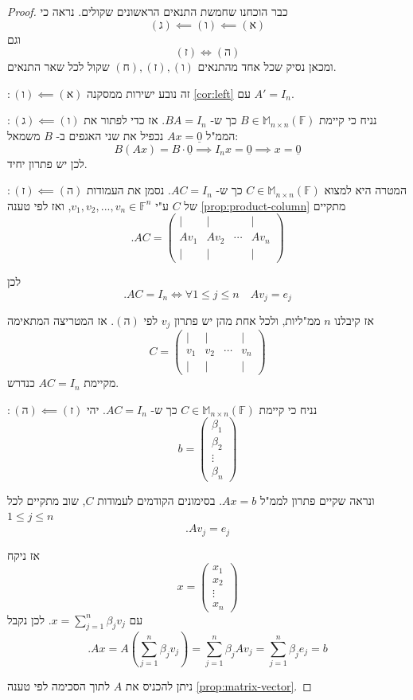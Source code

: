 \documentclass[12pt]{report}
\theoremstyle{plain}
\theoremstyle{definition}
\newcommand{\F}{\mathbb{F}}
\newcommand{\M}{\mathbb{M}}
\newcommand{\0}{\mathbf{0}}
\begin{document}
\begin{proof}
כבר הוכחנו שחמשת התנאים הראשונים שקולים. נראה כי
$$
(\text{ג}) \impliedby (\text{ו}) \impliedby (\text{א})
$$
וגם
$$
(\text{ז}) \iff (\text{ה})
$$
ומכאן נסיק שכל אחד מהתנאים
$
(\text{ח}) ,(\text{ז}) ,(\text{ו})
$
שקול לכל שאר התנאים.

\noindent $
:(\text{ו}) \impliedby (\text{א})
$
זה נובע ישירות ממסקנה
\ref{cor:left}
עם
$A'=I_n$.

\noindent $
:(\text{ג}) \impliedby (\text{ו})
$
נניח כי קיימת
$B\in\M_{n\times n}(\F)$
כך ש-
$BA=I_n$.
אז כדי לפתור את הממ"ל
$Ax=\underline{0}$
נכפיל את שני האגפים ב-
$B$
משמאל:
$$
B(Ax)=B\cdot\underline{0} \implies I_n x=\underline{0} \implies x=\underline{0}
$$
לכן יש פתרון יחיד.

\noindent $
:(\text{ז}) \impliedby (\text{ה})
$
המטרה היא למצוא
$C\in\M_{n\times n}(\F)$
כך ש-
$AC=I_n$.
נסמן את העמודות של 
$C$
ע"י
$v_1,v_2,...,v_n\in\F^n$,
ואז לפי טענה
\ref{prop:product-column}
מתקיים
$$
.AC=\begin{pmatrix}
| & | & & | \\
Av_1 & Av_2 & \cdots & Av_n \\
| & | & & |
\end{pmatrix}
$$

לכן
$$
.AC=I_n \iff \forall 1\leq j\leq n \quad Av_j=e_j
$$

אז קיבלנו
$n$
ממ"ליות,
ולכל אחת מהן יש פתרון
$v_j$
לפי 
$(\text{ה})$.
אז המטריצה המתאימה 
$$
C=\begin{pmatrix}
| & | & & | \\
v_1 & v_2 & \cdots & v_n \\
| & | & & |
\end{pmatrix}
$$
מקיימת
$AC=I_n$
כנדרש.

\noindent $
:(\text{ה}) \impliedby (\text{ז})
$
נניח כי קיימת
$C\in\M_{n\times n}(\F)$
כך ש-
$AC=I_n$.
יהי 
$$
b=\begin{pmatrix}
\beta_1 \\
\beta_2 \\
\vdots \\
\beta_n 
\end{pmatrix}
$$

ונראה שקיים פתרון לממ"ל
$Ax=b$.
בסימונים הקודמים לעמודות
$C$,
שוב מתקיים לכל 
$1\leq j\leq n$
$$
.Av_j=e_j
$$

אז ניקח
$$
x=\begin{pmatrix}
x_1 \\
x_2 \\
\vdots \\
x_n
\end{pmatrix}
$$
עם
$
.x=\sum_{j=1}^n \beta_j v_j
$
לכן נקבל
$$
.Ax=A(\sum_{j=1}^n \beta_j v_j)=\sum_{j=1}^n \beta_j Av_j=\sum_{j=1}^n \beta_j e_j=b
$$

ניתן להכניס את
$A$
לתוך הסכימה לפי טענה 
\ref{prop:matrix-vector}.
\end{proof}
\end{document}
